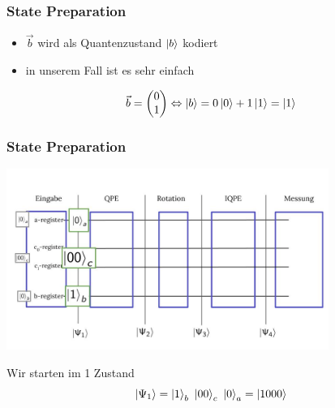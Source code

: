 \begin{frame}
    \frametitle{State Preparation}

    \begin{itemize}
        \item $\vec{b}$ wird als Quantenzustand $\ket{b}$ kodiert
        \item in unserem Fall ist es sehr einfach
    \end{itemize}

    $$\vec{b} = \begin{pmatrix} 0\\ 1\\ \end{pmatrix} \Leftrightarrow \ket{b} = 0 \ket{0} + 1 \ket{1} = \ket{1}$$

\end{frame}

\begin{frame}
    \frametitle{State Preparation}

    \begin{center}
    \includegraphics[width=10.5cm]{img/example_circuit/example_circuit_1.jpg}
    \end{center}

    Wir starten im 1 Zustand
    $$\ket{\Psi_1} = \ket{1}_b\ \ket{00}_c\ \ket{0}_a = \ket{1000}$$

\end{frame}




